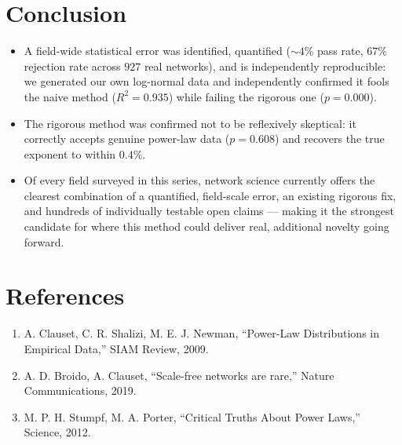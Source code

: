 \documentclass[10pt,journal,compsoc]{IEEEtran}
\begin{document}
\section{Conclusion}
\begin{itemize}
    \item A field-wide statistical error was identified, quantified ($\sim\!4\%$ pass rate, $67\%$ rejection rate across $927$ real networks), and is independently reproducible: we generated our own log-normal data and independently confirmed it fools the naive method ($R^2=0.935$) while failing the rigorous one ($p=0.000$).
    \item The rigorous method was confirmed not to be reflexively skeptical: it correctly accepts genuine power-law data ($p=0.608$) and recovers the true exponent to within $0.4\%$.
    \item Of every field surveyed in this series, network science currently offers the clearest combination of a quantified, field-scale error, an existing rigorous fix, and hundreds of individually testable open claims --- making it the strongest candidate for where this method could deliver real, additional novelty going forward.
\end{itemize}

\section*{References}
\begin{small}
\begin{enumerate}
    \item A. Clauset, C. R. Shalizi, M. E. J. Newman, ``Power-Law Distributions in Empirical Data,'' SIAM Review, 2009.
    \item A. D. Broido, A. Clauset, ``Scale-free networks are rare,'' Nature Communications, 2019.
    \item M. P. H. Stumpf, M. A. Porter, ``Critical Truths About Power Laws,'' Science, 2012.
\end{enumerate}
\end{small}
\end{document}

